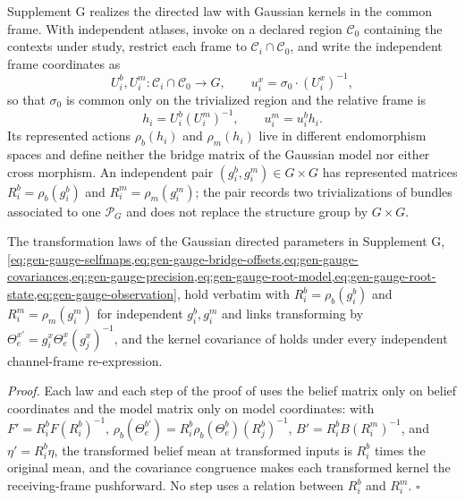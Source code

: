 Supplement G realizes the directed law with Gaussian kernels in the common frame. With independent
atlases, invoke  on a declared region \(\mathcal C_0\)
containing the contexts under study, restrict each frame to \(\mathcal C_i\cap\mathcal C_0\), and
write the independent frame coordinates as
\begin{equation}
U_i^b,U_i^m:\mathcal C_i\cap\mathcal C_0\longrightarrow G,
\qquad
u_i^x=\sigma_0\cdot(U_i^x)^{-1},
\label{eq:gen-frames}
\end{equation}
so that \(\sigma_0\) is common only on the trivialized region and the relative frame is
\begin{equation}
h_i=U_i^b(U_i^m)^{-1},
\qquad
u_i^m=u_i^bh_i.
\label{eq:gen-relative-principal-frame}
\end{equation}
Its represented actions \(\rho_b(h_i)\) and \(\rho_m(h_i)\) live in different endomorphism spaces
and define neither the bridge matrix of the Gaussian model nor either cross morphism. An independent
pair \((g_i^b,g_i^m)\in G\times G\) has represented matrices \(R_i^b=\rho_b(g_i^b)\) and
\(R_i^m=\rho_m(g_i^m)\); the pair records two trivializations of bundles associated to one
\(\mathscr P_G\) and does not replace the structure group by \(G\times G\).

The transformation laws of the Gaussian directed parameters in Supplement G,
\cref{eq:gen-gauge-selfmaps,eq:gen-gauge-bridge-offsets,eq:gen-gauge-covariances,eq:gen-gauge-precision,eq:gen-gauge-root-model,eq:gen-gauge-root-state,eq:gen-gauge-observation},
hold verbatim with \(R_i^b=\rho_b(g_i^b)\) and \(R_i^m=\rho_m(g_i^m)\) for independent
\(g_i^b,g_i^m\) and links transforming by \(\Theta_e^{x\prime}=g_i^x\Theta_e^x(g_j^x)^{-1}\), and
the kernel covariance of  holds under every independent
channel-frame re-expression. 

\noindent\emph{Proof.}
Each law and each step of the proof of  uses the belief matrix
only on belief coordinates and the model matrix only on model coordinates: with
\(F'=R_i^bF(R_i^b)^{-1}\), \(\rho_b(\Theta_e^{b\prime})=R_i^b\rho_b(\Theta_e^b)(R_j^b)^{-1}\),
\(B'=R_i^bB(R_i^m)^{-1}\), and \(\eta'=R_i^b\eta\), the transformed belief mean at transformed inputs
is \(R_i^b\) times the original mean, and the covariance congruence makes each transformed kernel the
receiving-frame pushforward. No step uses a relation between \(R_i^b\) and \(R_i^m\).
\hfill$\square$

